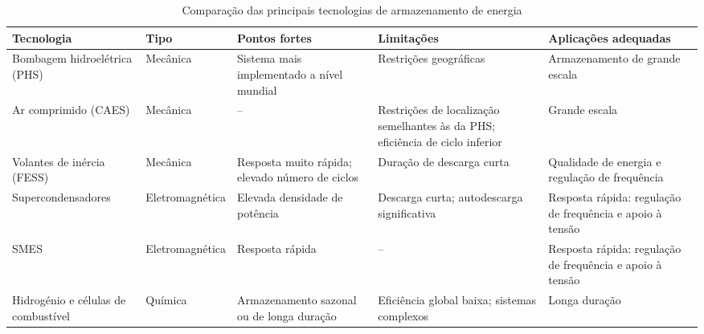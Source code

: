 \begin{table}[htbp]
    \centering
    \caption{Comparação das principais tecnologias de armazenamento de energia}
    \label{tab:comparacao_tecnologias_armazenamento}

    \footnotesize
    \renewcommand{\arraystretch}{1.3}
    \setlength{\tabcolsep}{4pt}
    
    \begin{tabularx}{\textwidth}{
        |>{\centering\arraybackslash}p{2.1cm}
        |>{\centering\arraybackslash}p{1.8cm}
        |>{\centering\arraybackslash}X
        |>{\centering\arraybackslash}X
        |>{\centering\arraybackslash}X|}
        
        \hline
        \textbf{Tecnologia} &
        \textbf{Tipo} &
        \textbf{Pontos fortes} &
        \textbf{Limitações} &
        \textbf{Aplicações adequadas} \\
        \hline

        Bombagem hidroelétrica (PHS) &
        Mecânica &
        Sistema mais implementado a nível mundial &
        Restrições geográficas &
        Armazenamento de grande escala \\
        \hline

        Ar comprimido (CAES) &
        Mecânica &
        -- &
        Restrições de localização semelhantes às da PHS; eficiência de ciclo inferior &
        Grande escala \\
        \hline

        Volantes de inércia (FESS) &
        Mecânica &
        Resposta muito rápida; elevado número de ciclos &
        Duração de descarga curta &
        Qualidade de energia e regulação de frequência \\
        \hline

        Supercon\-densadores &
        Eletromag\-nética &
        Elevada densidade de potência &
        Descarga curta; autodescarga significativa &
        Resposta rápida: regulação de frequência e apoio à tensão \\
        \hline

        SMES &
        Eletromag\-nética &
        Resposta rápida &
        -- &
        Resposta rápida: regulação de frequência e apoio à tensão \\
        \hline

        Hidrogénio e células de combustível &
        Química &
        Armazenamento sazonal ou de longa duração &
        Eficiência global baixa; sistemas complexos &
        Longa duração \\
        \hline


\end{tabularx}
\end{table}
